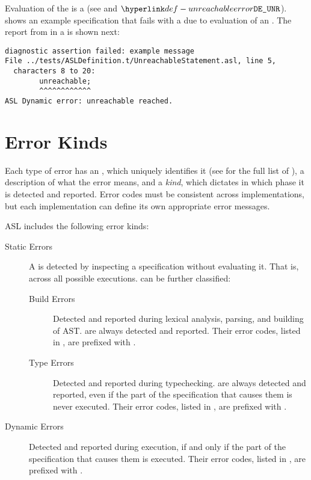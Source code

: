 Evaluation of the \unreachablestatementterm{} is a \dynamicerrorterm{}
(see  and \errorcodeterm{} $\UnreachableError$).
%
 shows an example specification that
fails with a \dynamicerrorsterm{} due to evaluation of an \unreachablestatementterm{}.
The report from \aslref{} in a \linuxbashshell{} is shown next:

\begin{Verbatim}[fontsize=\footnotesize, frame=single]
diagnostic assertion failed: example message
File ../tests/ASLDefinition.t/UnreachableStatement.asl, line 5,
  characters 8 to 20:
        unreachable;
        ^^^^^^^^^^^^
ASL Dynamic error: unreachable reached.
\end{Verbatim}

\section{Error Kinds\label{sec:Error Kinds}}
\hypertarget{def-errorcodeterm}{}
Each type of error has an \emph{\errorcodeterm}, which uniquely identifies it
(see  for the full list of \errorcodesterm),
a description of what the error means,
and a \emph{kind}, which dictates in which phase it is detected and reported.
Error codes must be consistent across implementations, but each implementation
can define its own appropriate error messages.

ASL includes the following error kinds:
\begin{description}
  \item[Static Errors] \hypertarget{def-staticerrorterm}{}
  A \emph{\staticerrorterm} is detected by inspecting a specification without evaluating it.
  That is, across all possible executions. \staticerrorsterm{} can be further classified:
  \begin{description}
    \item[Build Errors] \hypertarget{def-builderrorterm}{}
      Detected and reported during lexical analysis, parsing, and building of AST.
      \Builderrorsterm{} are always detected and reported.
      Their error codes, listed in , are prefixed with \BuildErrorPrefix.

    \item[Type Errors] \hypertarget{def-typingerrorterm}{}
      Detected and reported during typechecking.
      \Typingerrorsterm{} are always detected and reported, even if the part of the specification that causes them is never executed.
      Their error codes, listed in , are prefixed with \TypeErrorPrefix.
  \end{description}

  \item[Dynamic Errors] \hypertarget{def-dynamicerrorterm}{}
    Detected and reported during execution, if and only if the part of the specification that causes them is executed.
    Their error codes, listed in , are prefixed with \DynamicErrorPrefix.
\end{description}

